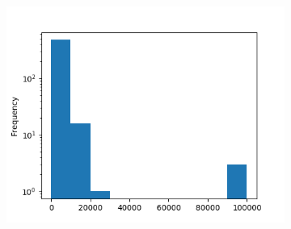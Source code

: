 \begin{figure}[!ht]
    \vspace{5mm}

    \begin{subfigure}[!ht]{.5\linewidth}
        \centering
        \includegraphics[width=\textwidth]{./img/earned-dividends-hist-targets.png}
    \end{subfigure}
\end{figure}


